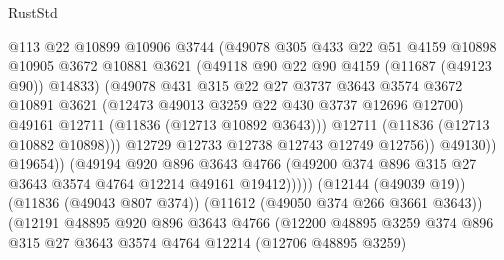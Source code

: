 \begin{lexlean}{RustStd}
\begin{coremodule}
                                @113
                                @22
                                @10899
                                @10906
                                @3744
                                (@49078
                                  @305
                                  @433
                                  @22
                                  @51
                                  @4159
                                  @10898
                                  @10905
                                  @3672
                                  @10881
                                  @3621
                                  (@49118 @90 @22 @90 @4159 (@11687 (@49123 @90)) @14833)
                                  (@49078
                                    @431
                                    @315
                                    @22
                                    @27
                                    @3737
                                    @3643
                                    @3574
                                    @3672
                                    @10891
                                    @3621
                                    (@12473 @49013 @3259 @22 @430 @3737 @12696 @12700)
                                    @49161
                                    @12711
                                    (@11836 (@12713 @10892 @3643)))
                                  @12711
                                  (@11836 (@12713 @10882 @10898)))
                                @12729
                                @12733
                                @12738
                                @12743
                                @12749
                                @12756))
                            @49130))
                        @19654))
                    (@49194
                      @920
                      @896
                      @3643
                      @4766
                      (@49200 @374 @896 @315 @27 @3643 @3574 @4764 @12214 @49161 @19412)))))
              (@12144 (@49039 @19))
              (@11836 (@49043 @807 @374))
              (@11612 (@49050 @374 @266 @3661 @3643))
              (@12191
                @48895
                @920
                @896
                @3643
                @4766
                (@12200
                  @48895
                  @3259
                  @374
                  @896
                  @315
                  @27
                  @3643
                  @3574
                  @4764
                  @12214
                  (@12706 @48895 @3259)

\end{coremodule}
\end{lexlean}
